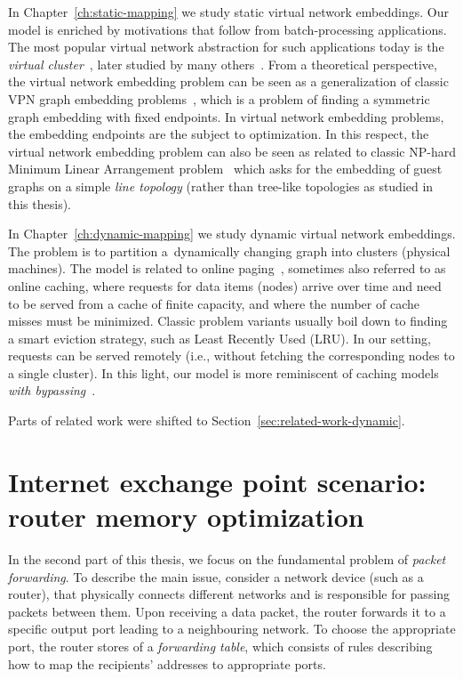 In Chapter~\ref{ch:static-mapping} we study static virtual network embeddings.
Our model is enriched by motivations that follow from batch-processing applications.
The most popular virtual network abstraction for such applications today is the \emph{virtual cluster}~\cite{oktopus}, later studied by many others~\cite{talk-about,infocom16,ccr15emb,proteus}.
From a theoretical perspective, the virtual network embedding problem can be seen as a generalization
of classic VPN graph embedding problems~\cite{Goyal2008,gupta2001provisioning}, which is a problem of finding a symmetric graph embedding with fixed endpoints.
In virtual network embedding problems, the embedding endpoints are the subject to optimization.
In this respect, the virtual network embedding problem can also be seen as related to
classic NP-hard Minimum Linear Arrangement problem~\cite{mla,mla-survey} which asks for the
embedding of guest graphs on a simple \emph{line topology} (rather than tree-like topologies as
studied in this thesis).




In Chapter~\ref{ch:dynamic-mapping} we study dynamic virtual network embeddings.
The problem is to partition a~dynamically changing graph into clusters (physical machines).
The model is related to online
paging~\cite{SleTar85,FKLMSY91,McGSle91,AcChNo00}, sometimes also referred to
as online caching, where requests for data items (nodes) arrive over time and
need to be served from a cache of finite capacity, and where the number of
cache misses must be minimized. Classic problem variants usually boil down to
finding a smart eviction strategy, such as Least Recently Used (LRU). In our
setting, requests can be served remotely (i.e., without fetching the
corresponding nodes to a single cluster). In this light, our model is more
reminiscent of caching models \emph{with
bypassing}~\cite{EpImLN11,EpImLN15,Irani02}.




Parts of related work were shifted to Section~\ref{sec:related-work-dynamic}.



\section{Internet exchange point scenario: router memory optimization}
\label{sec:intro-packet-forwarding}

In the second part of this thesis, we focus on the fundamental problem of \emph{packet forwarding}.
To describe the main issue, consider a network device (such as a router), that physically connects different networks and is responsible for passing packets between them.
Upon receiving a data packet, the router forwards it to a specific output port leading to a neighbouring network.
To choose the appropriate port, the router stores of a \emph{forwarding table}, which consists of rules describing how to map the recipients' addresses to appropriate ports.

